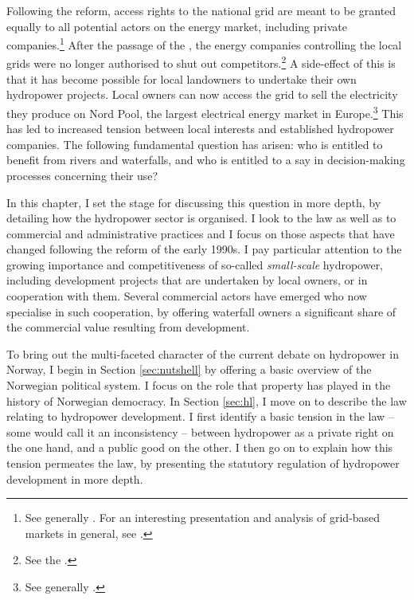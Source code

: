Following the reform, access rights to the national grid are meant to be granted equally to all potential actors on the energy market, including private companies.\footnote{See generally \cite{hammer96}. For an interesting presentation and analysis of grid-based markets in general, see \cite{falch04}.} After the passage of the \cite{ea90}, the energy companies controlling the local grids were no longer authorised to shut out competitors.\footnote{See the \cite[3-4]{ea90}.} A side-effect of this is that it has become possible for local landowners to undertake their own hydropower projects. Local owners can now access the grid to sell the electricity they produce on Nord Pool, the largest electrical energy market in Europe.\footnote{See generally \cite{larsen06,larsen08,larsen12}.} This has led to increased tension between local interests and established hydropower companies. The following fundamental question has arisen: who is entitled to benefit from rivers and waterfalls, and who is entitled to a say in decision-making processes concerning their use?

In this chapter, I set the stage for discussing this question in more depth, by detailing how the hydropower sector is organised. I look to the law as well as to commercial and administrative practices and I focus on those aspects that have changed following the reform of the early 1990s. I pay particular attention to the growing importance and competitiveness of so-called {\it small-scale} hydropower, including development projects that are undertaken by local owners, or in cooperation with them. Several commercial actors have emerged who now specialise in such cooperation, by offering waterfall owners a significant share of the commercial value resulting from development. 

To bring out the multi-faceted character of the current debate on hydropower in Norway, I begin in Section \ref{sec:nutshell} by offering a basic overview of the Norwegian political system. I focus on the role that property has played in the history of Norwegian democracy. In Section \ref{sec:hl}, I move on to describe the law relating to hydropower development. I first identify a basic tension in the law -- some would call it an inconsistency -- between hydropower as a private right on the one hand, and a public good on the other. I then go on to explain how this tension permeates the law, by presenting the statutory regulation of hydropower development in more depth.


